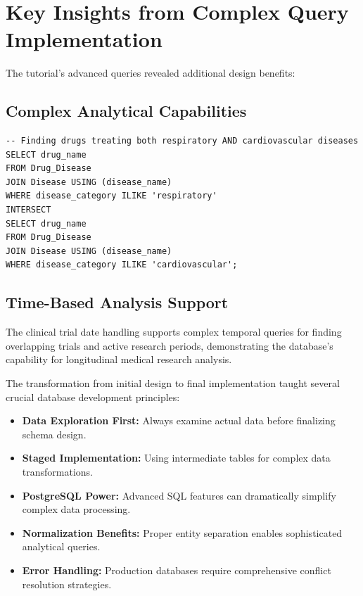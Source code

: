 \documentclass[12pt,a4paper]{article}
\begin{document}
\section{Key Insights from Complex Query Implementation}

The tutorial's advanced queries revealed additional design benefits:

\subsection{Complex Analytical Capabilities}
\begin{lstlisting}[style=sqlcode, caption=Advanced Query Example]
-- Finding drugs treating both respiratory AND cardiovascular diseases
SELECT drug_name
FROM Drug_Disease
JOIN Disease USING (disease_name)
WHERE disease_category ILIKE 'respiratory'
INTERSECT
SELECT drug_name
FROM Drug_Disease
JOIN Disease USING (disease_name)
WHERE disease_category ILIKE 'cardiovascular';
\end{lstlisting}

\subsection{Time-Based Analysis Support}
The clinical trial date handling supports complex temporal queries for finding overlapping trials and active research periods, demonstrating the database's capability for longitudinal medical research analysis.

The transformation from initial design to final implementation taught several crucial database development principles:

\begin{itemize}
    \item \textbf{Data Exploration First:} Always examine actual data before finalizing schema design.
    \item \textbf{Staged Implementation:} Using intermediate tables for complex data transformations.
    \item \textbf{PostgreSQL Power:} Advanced SQL features can dramatically simplify complex data processing.
    \item \textbf{Normalization Benefits:} Proper entity separation enables sophisticated analytical queries.
    \item \textbf{Error Handling:} Production databases require comprehensive conflict resolution strategies.
\end{itemize}
\end{document}
